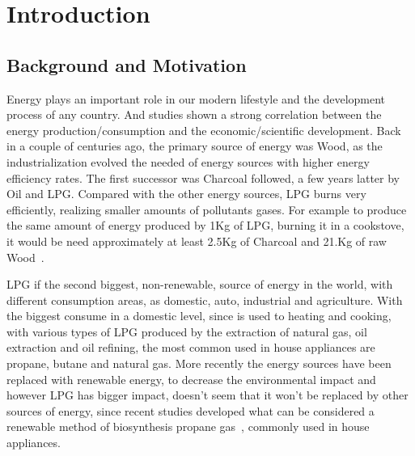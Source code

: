 \cleardoublepage
{}
\chapter{Introduction}
\section{Background and Motivation} %

Energy plays an important role in our modern lifestyle and the development process of any country. And studies shown a strong correlation between the energy production/consumption and the economic/scientific development. Back in a couple of centuries ago, the primary source of energy was Wood, as the industrialization evolved the needed of energy sources with higher energy efficiency rates\cite{demirbasGlobalEnergySources2004}. The first successor was Charcoal followed, a few years latter by Oil and LPG. Compared with the other energy sources, LPG burns very efficiently, realizing smaller amounts of pollutants gases. For example to produce the same amount of energy produced by 1Kg of LPG, burning it in a cookstove, it would be need approximately at least 2.5Kg of Charcoal and 21.Kg of raw Wood~\cite{File201403Multiple}. 

LPG if the second biggest, non-renewable, source of energy in the world, with different consumption areas, as domestic, auto, industrial and agriculture. With the biggest consume in a domestic level, since is used to heating and cooking, with various types of LPG produced by the extraction of natural gas, oil extraction and oil refining, the most common used in house appliances are propane, butane and natural gas\cite{LiquefiedPetroleumGas}. More recently the energy sources have been replaced with renewable energy, to decrease the environmental impact and however LPG has bigger impact, doesn't seem that it won't be replaced by other sources of energy, since recent studies developed what can be considered a renewable method of biosynthesis propane gas~\cite{kallioEngineeredPathwayBiosynthesis2014b}, commonly used in house appliances.   

